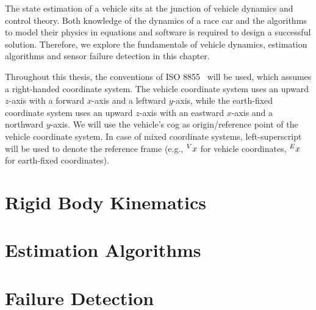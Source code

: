 The state estimation of a vehicle sits at the junction of vehicle dynamics and control theory. Both knowledge of the dynamics of a race car and the algorithms to model their physics in equations and software is required to design a successful solution. Therefore, we explore the fundamentals of vehicle dynamics, estimation algorithms and sensor failure detection in this chapter.

Throughout this thesis, the conventions of ISO 8855~\cite{ISO.2011} will be used, which assumes a right-handed coordinate system. The vehicle coordinate system uses an upward $z$-axis with a forward $x$-axis and a leftward $y$-axis, while the earth-fixed coordinate system uses an upward $z$-axis with an eastward $x$-axis and a northward $y$-axis. We will use the vehicle's \gls{cog} as origin/reference point of the vehicle coordinate system. In case of mixed coordinate systems, left-superscript will be used to denote the reference frame (e.g., $\prescript{V}{}{x}$ for vehicle coordinates, $\prescript{E}{}{x}$ for earth-fixed coordinates).

\section{Rigid Body Kinematics}


\section{Estimation Algorithms}


\section{Failure Detection}

